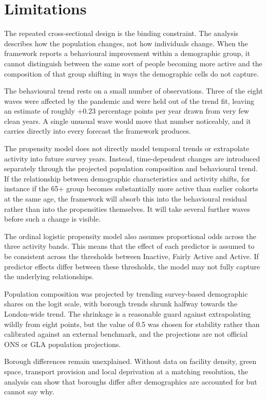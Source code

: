 \documentclass[ %
                    author={Ashrey Ashrey, Sanya Kapoor, Trisha Sharma, Yash Bhooshan Pandloskar},
                supervisor={Dr. Dalila O’Grady},
                    degree={MSc},
                     title={Using machine learning to forecast physical activity participation, volunteering and activity patterns in London},
                  subtitle={},
                      type={},
                      year={2021}]{dissertation}
\begin{document}
\section{Limitations}

The repeated cross-sectional design is the binding constraint. The analysis
describes how the population changes, not how individuals change. When the
framework reports a behavioural improvement within a demographic group, it cannot distinguish between the same sort of people becoming more active and the composition of that group shifting in ways the demographic cells do not capture.

The behavioural trend rests on a small number of observations. Three of the eight waves were affected by the pandemic and were held out of the trend fit, leaving an estimate of roughly $+0.23$ percentage points per year drawn from very few clean years. A single unusual wave would move that number noticeably, and it carries directly into every forecast the framework produces.

The propensity model does not directly model temporal trends or extrapolate activity into future survey years. Instead, time-dependent changes are introduced separately through the projected population composition and behavioural trend. If the relationship between demographic characteristics and activity shifts, for instance if the 65+ group becomes substantially more active than earlier cohorts at the same age, the framework will absorb this into the behavioural residual rather than into the propensities themselves. It will take several further waves before such a change is visible.

The ordinal logistic propensity model also assumes proportional odds across the three activity bands. This means that the effect of each predictor is assumed to be consistent across the thresholds between Inactive, Fairly Active and Active. If predictor effects differ between these thresholds, the model may not fully capture the underlying relationships.

Population composition was projected by trending survey-based demographic shares on the logit scale, with borough trends shrunk halfway towards the London-wide trend. The shrinkage is a reasonable guard against extrapolating wildly from eight points, but the value of 0.5 was chosen for stability rather than calibrated against an external benchmark, and the projections are not official ONS or GLA population projections.

Borough differences remain unexplained. Without data on facility density, green space, transport provision and local deprivation at a matching resolution, the analysis can show that boroughs differ after demographics are accounted for but cannot say why.
\end{document}

